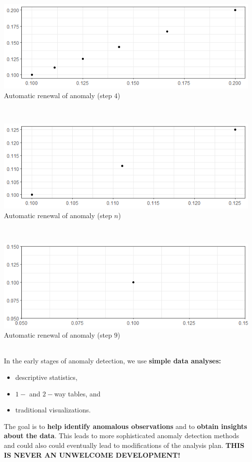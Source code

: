 \documentclass[20pt,landscape,footrule,headrule]{foils}
\newcommand{\newl}{\newline\newline}
\begin{document}
\newpage\ \\ 
\begin{center}
\includegraphics[width=\textwidth]{Images/ADOA4.png} \\ Automatic renewal of anomaly (step $4$)
\end{center}
\newpage\ \\ 
\begin{center}
\includegraphics[width=\textwidth]{Images/ADOAn.png}\\ Automatic renewal of anomaly (step $n$)
\end{center}
\newpage\ \\ 
\begin{center}
\includegraphics[width=\textwidth]{Images/ADOA10.png}\\ Automatic renewal of anomaly (step $9$)
\end{center}
\newpage\ \\ \noindent In the early stages of anomaly detection, we use \textbf{simple data analyses:}
\begin{itemize}
\item descriptive statistics, 
\item $1-$ and $2-$way tables, and  
\item traditional  visualizations.
\end{itemize}
The goal is to \textbf{help identify anomalous observations} and to \textbf{obtain insights about the data}.
\newl 
This leads to more sophisticated anomaly detection methods and could also could eventually lead to modifications of the analysis plan. 
\newl \textbf{THIS IS NEVER AN UNWELCOME DEVELOPMENT!}
\end{document}
